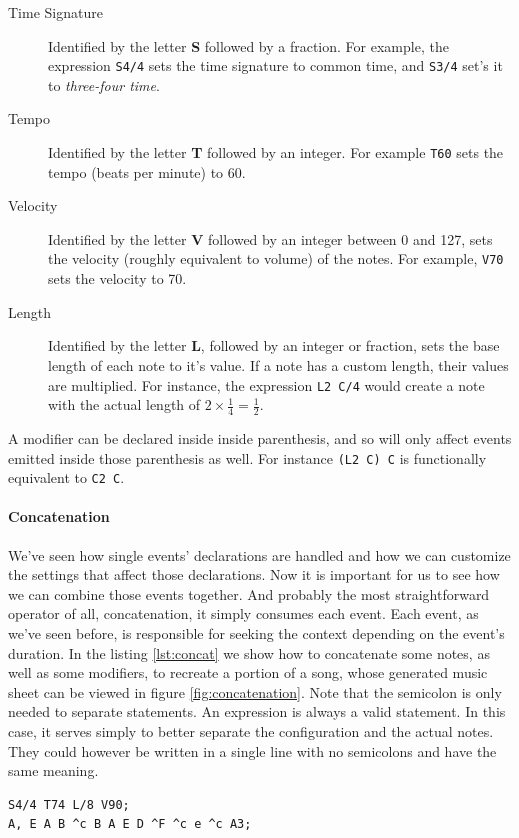 \documentclass[a4paper,UKenglish,cleveref, autoref]{oasics-v2019}
\begin{document}
\begin{description}
    \item[Time Signature] Identified by the letter \textbf{S} followed by a fraction. For example, the expression \texttt{S4/4} sets the time signature to common time, and \texttt{S3/4} set's it to \textit{three-four time}.
    \item[Tempo] Identified by the letter \textbf{T} followed by an integer. For example \texttt{T60} sets the tempo (beats per minute) to 60.
    \item[Velocity] Identified by the letter \textbf{V} followed by an integer between 0 and 127, sets the velocity (roughly equivalent to volume) of the notes. For example, \texttt{V70} sets the velocity to 70.
    \item[Length] Identified by the letter \textbf{L}, followed by an integer or fraction, sets the base length of each note to it's value. If a note has a custom length, their values are multiplied. For instance, the expression \texttt{L2 C/4} would create a note with the actual length of $2 \times \frac{1}{4} = \frac{1}{2}$.
\end{description}

A modifier can be declared inside inside parenthesis, and so will only affect events emitted inside those parenthesis as well. For instance \texttt{(L2 C) C} is functionally equivalent to \texttt{C2 C}.

\paragraph*{Concatenation}
We've seen how single events' declarations are handled and how we can customize the settings that affect those declarations. Now it is important for us to see how we can combine those events together. And probably the most straightforward operator of all, concatenation, it simply consumes each event. Each event, as we've seen before, is responsible for seeking the context depending on the event's duration. In the listing \ref{lst:concat} we show how to concatenate some notes, as well as some modifiers, to recreate a portion of a song, whose generated music sheet can be viewed in figure \ref{fig:concatenation}. Note that the semicolon is only needed to  separate statements. An expression is always a valid statement. In this case, it serves simply to better separate the configuration and the actual notes. They could however be written in a single line with no semicolons and have the same meaning. 
\begin{lstlisting}[caption={Snippet of the song \textit{Wet Hands} by C418},label=lst:concat,captionpos=t,abovecaptionskip=-\medskipamount]
S4/4 T74 L/8 V90;
A, E A B ^c B A E D ^F ^c e ^c A3;
\end{lstlisting}
\end{document}
